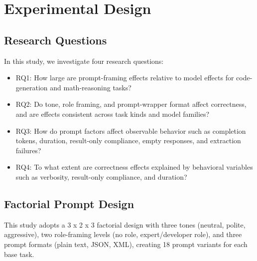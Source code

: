 \documentclass{llncs}
\providecommand{\tightlist}{%
  \setlength{\itemsep}{0pt}\setlength{\parskip}{0pt}}
\begin{document}
\section{Experimental Design}\label{experimental-design}

\subsection{Research Questions}\label{research-questions}

    In this study, we investigate four  research questions:

\begin{itemize}
\tightlist
\item
  RQ1: How large are prompt-framing effects relative to model effects for code-generation and math-reasoning tasks?
\item
  RQ2: Do tone, role framing, and prompt-wrapper format affect correctness, and are effects consistent across task kinds and model families?
\item
  RQ3: How do prompt factors affect observable behavior such as completion tokens, duration, result-only compliance, empty responses, and extraction failures?
\item
  RQ4: To what extent are correctness effects explained by behavioral variables such as verbosity, result-only compliance, and duration?
\end{itemize}

\subsection{Factorial Prompt Design}\label{factorial-prompt-design}

This study adopts a 3 x 2 x 3 factorial design with three tones (neutral, polite, aggressive), two role-framing levels (no role, expert/developer role), and three prompt formats (plain text, JSON, XML), creating 18 prompt variants for each base task.
\end{document}
